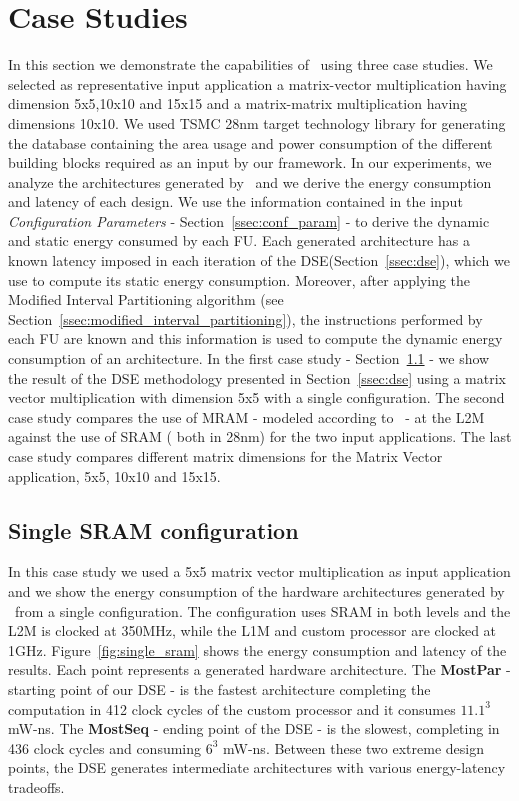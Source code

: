 \section{Case Studies}
\label{sec:case_studies}
In this section we demonstrate the capabilities of \frameworkname~using three case studies. We selected as representative input application a matrix-vector multiplication having dimension 5x5,10x10 and 15x15 and a matrix-matrix multiplication having dimensions 10x10. We used TSMC 28nm target technology library for generating the database containing the area usage and power consumption of the different building blocks required as an input by our framework.
In our experiments, we analyze the architectures generated by \frameworkname~and we derive the energy consumption and latency of each design. We use the information contained in the input \textit{Configuration Parameters} - Section~\ref{ssec:conf_param} - to derive the dynamic and static energy consumed by each FU. Each generated architecture has a known latency imposed in each iteration of the DSE(Section~\ref{ssec:dse}), which we use to compute its static energy consumption. Moreover, after applying the Modified Interval Partitioning algorithm (see Section~\ref{ssec:modified_interval_partitioning}), the instructions performed by each FU are known and this information is used to compute the dynamic energy consumption of an architecture.
In the first case study - Section~\ref{ssec:exp_single} - we show the result of the DSE methodology presented in Section~\ref{ssec:dse} using a matrix vector multiplication with dimension 5x5 with a single configuration. The second case study compares the use of MRAM - modeled according to~\cite{8310393} - at the L2M against the use of SRAM ( both in 28nm) for the two input applications. The last case study compares different matrix dimensions for the Matrix Vector application, 5x5, 10x10 and 15x15.


\subsection{Single SRAM configuration}
\label{ssec:exp_single}

In this case study we used a 5x5 matrix vector multiplication as input application and we show the energy consumption of the hardware architectures generated by \frameworkname~from a single configuration. The configuration uses SRAM in both levels and the L2M is clocked at 350MHz, while the L1M and custom processor are clocked at 1GHz. Figure~\ref{fig:single_sram} shows the energy consumption and latency of the results. Each point represents a generated hardware architecture. The \textbf{MostPar} - starting point of our DSE - is the fastest architecture completing the computation in 412 clock cycles of the custom processor and it consumes $11.1^3$ mW-ns. The \textbf{MostSeq} - ending point of the DSE - is the slowest, completing in 436 clock cycles and consuming $6^3$ mW-ns. Between these two extreme design points, the DSE generates intermediate architectures with various energy-latency tradeoffs. 


